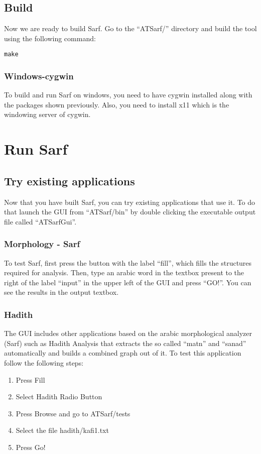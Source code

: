 \documentclass{article}
\begin{document}
\subsection{Build}
Now we are ready to build Sarf.
Go to the ``ATSarf/'' directory and build the tool using the following command:
\begin{verbatim}
make
\end{verbatim}

\subsubsection{Windows-cygwin}

To build and run Sarf on windows, you need to have cygwin installed along with the packages shown previously. Also, you need to install x11 which is the windowing server of cygwin.

\section{Run Sarf}

\subsection{Try existing applications}
Now that you have built Sarf, you can try existing applications that use it. To do that launch the GUI from ``ATSarf/bin'' by double clicking the executable output file called ``ATSarfGui''.

\subsubsection{Morphology - Sarf}
To test Sarf, first press the button with the label ``fill'', which fills the structures required for analysis. Then, type an arabic word in the textbox present to the right of the label ``input'' in the upper left of the GUI and press ``GO!''. You can see the results in the output textbox.\\

\subsubsection{Hadith}
The GUI includes other applications based on the arabic morphological analyzer (Sarf) such as Hadith Analysis that extracts the so called ``matn'' and ``sanad'' automatically and builds a combined graph out of it. To test this application follow the following steps:
\begin{enumerate}
\item Press Fill
\item Select Hadith Radio Button
\item Press Browse and go to ATSarf/tests
\item Select the file hadith/kafi1.txt
\item Press Go!
\end{enumerate}
\end{document}
